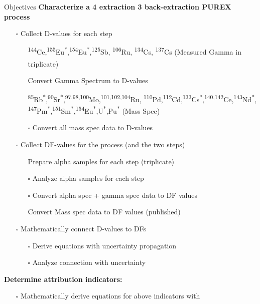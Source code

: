 \documentclass{beamer}
\newcommand{\tss}{\textsuperscript}
\newcommand{\cmark}{\ding{51}}%
\newcommand{\done}{\rlap{$\square$}{\raisebox{2pt}{\large\hspace{1pt}\cmark}}%
  \hspace{-2.5pt}}
\newcommand{\notdone}{$\square$}
\begin{document}
\begin{frame}[allowframebreaks]{Objectives}
\vspace{-0.7cm}
\textbf{\small Characterize a 4 extraction 3 back-extraction PUREX process}
\begin{itemize}
\item[\notdone]{Collect D-values for each step}
  \begin{itemize}
  \item[\tiny\done]{\tiny \tss{144}Ce,\tss{155}Eu\tss{*},\tss{154}Eu\tss{*},\tss{125}Sb,
    \tss{106}Ru, \tss{134}Cs, \tss{137}Cs
    (Measured Gamma in triplicate)\tss{\cite{chirayath2015trace}}}
  \item[\tiny\done]{\tiny Convert Gamma Spectrum to D-values}
  \item[\tiny\done]{\tiny \tss{85}Rb\tss{*},\tss{90}Sr\tss{*},\tss{97,98,100}Mo,\tss{101,102,104}Ru,
    \tss{110}Pd,\tss{112}Cd,\tss{133}Cs\tss{*},\tss{140,142}Ce,\tss{143}Nd\tss{*},
    \tss{147}Pm\tss{*},\tss{151}Sm\tss{*},\tss{154}Eu\tss{*},U\tss{*},Pu\tss{*} (Mass Spec)}
  \item[\tiny\notdone]{\tiny Convert all mass spec data to D-values}
  \end{itemize}
\item[\notdone]{Collect DF-values for the process (and the two steps)}
  \begin{itemize}
  \item[\tiny\done]{\tiny Prepare alpha samples for each step (triplicate)}
  \item[\tiny\notdone]{\tiny Analyze alpha samples for each step}
  \item[\tiny\notdone]{\tiny Convert alpha spec + gamma spec data to DF values}
  \item[\tiny\done]{\tiny Convert Mass spec data to DF values (published)}
  \end{itemize}
\item[\notdone]{Mathematically connect D-values to DFs}
  \begin{itemize}
  \item[\tiny\notdone]{\tiny Derive equations with uncertainty propagation}
  \item[\tiny\notdone]{\tiny Analyze connection with uncertainty}
  \end{itemize}
\end{itemize}
\framebreak
\vspace*{-1cm}
\textbf{\small Determine attribution indicators:}
\begin{itemize}
\item[\notdone]{\small Mathematically derive equations for above indicators with
}
\end{itemize}
\end{frame}
\end{document}

